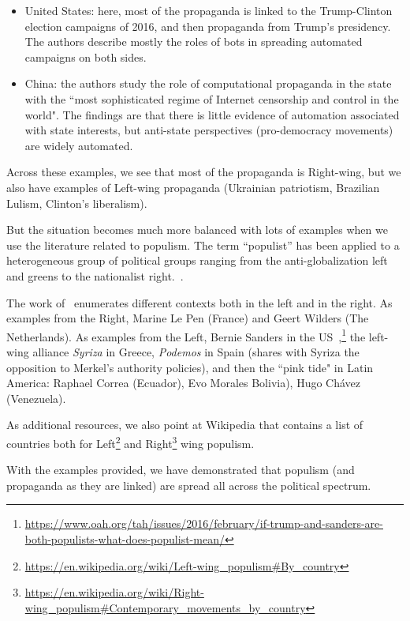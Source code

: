 \begin{itemize}
    \item United States: here, most of the propaganda is linked to the Trump-Clinton election campaigns of 2016, and then propaganda from Trump's presidency. The authors describe mostly the roles of bots in spreading automated campaigns on both sides.
    \item China: the authors study the role of computational propaganda in the state with the ``most sophisticated regime of Internet censorship and control in the world". The findings are that there is little evidence of automation associated with state interests, but anti-state perspectives (pro-democracy movements) are widely automated.
\end{itemize}

Across these examples, we see that most of the propaganda is Right-wing, but we also have examples of Left-wing propaganda (Ukrainian patriotism, Brazilian Lulism, Clinton's liberalism).

But the situation becomes much more balanced with lots of examples when we use the literature related to \gls{populism}.
The term ``populist” has been applied to a heterogeneous group of political groups ranging from the anti-globalization left and greens to the nationalist right.~\citep{kuzio2010populism}.

The work of~\citet{muller2017populism} enumerates different contexts both in the left and in the right. As examples from the Right, Marine Le Pen (France) and Geert Wilders (The Netherlands). As examples from the Left, Bernie Sanders in the US~\citep{postel2016if,jensen2017populism,busby2019framing},\footnote{\url{https://www.oah.org/tah/issues/2016/february/if-trump-and-sanders-are-both-populists-what-does-populist-mean/}} the left-wing alliance \emph{Syriza} in Greece, \emph{Podemos} in Spain (shares with Syriza the opposition to Merkel's authority policies), and then the ``pink tide" in Latin America: Raphael Correa (Ecuador), Evo Morales Bolivia), Hugo Chávez (Venezuela).

As additional resources, we also point at Wikipedia that contains a list of countries both for Left\footnote{\url{https://en.wikipedia.org/wiki/Left-wing_populism\#By_country}} and Right\footnote{\url{https://en.wikipedia.org/wiki/Right-wing_populism\#Contemporary_movements_by_country}} wing populism.


With the examples provided, we have demonstrated that populism (and propaganda as they are linked) are spread all across the political spectrum.

